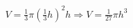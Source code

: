 \documentclass[preview]{standalone}
\begin{document}
\begin{align*}
V = \frac{1}{3}\pi \left(\frac{1}{3}h\right)^2 h \Rightarrow V = \frac{1}{27}\pi h^3
\end{align*}
\end{document}
